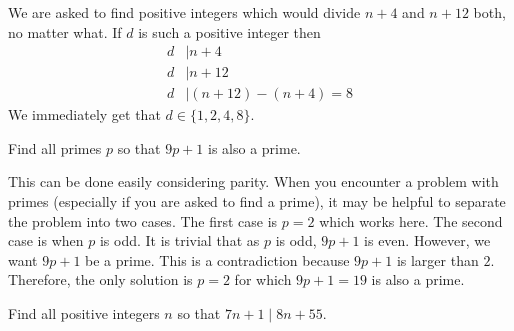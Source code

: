 \documentclass{subfile}
\begin{document}
		\begin{solution}
			We are asked to find positive integers which would divide $n+4$ and $n+12$ both, no matter what. If $d$ is such a positive integer then
				\begin{align*}
					d
						& \mid n+4\\
					d
						& \mid n+12\\
					d
						& \mid (n+12)-(n+4)=8
				\end{align*}
			We immediately get that $d\in\{1,2,4,8\}$.
		\end{solution}

		\begin{problem}
			Find all primes $p$ so that $9p+1$ is also a prime.
		\end{problem}

		\begin{solution}
			This can be done easily considering parity. When you encounter a problem with primes (especially if you are asked to find a prime), it may be helpful to separate the problem into two cases. The first case is $p=2$ which works here. The second case is when $p$ is odd. It is trivial that as $p$ is odd, $9p+1$ is even. However, we want $9p+1$ be a prime. This is a contradiction because $9p+1$ is larger than $2$. Therefore, the only solution is $p=2$ for which $9p+1=19$ is also a prime.
		\end{solution}

		\begin{problem}
			Find all positive integers $n$ so that $7n+1\mid 8n+55$.
		\end{problem}
\end{document}
